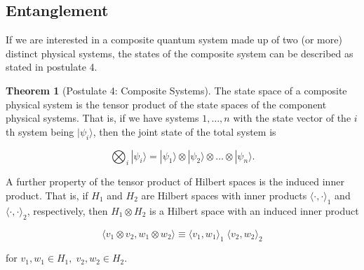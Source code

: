 \documentclass{article}
\theoremstyle{definition}
\newtheorem{theorem}{Theorem}[section]
\begin{document}
  \subsection{Entanglement}

    If we are interested in a composite quantum system made up of two (or more) distinct physical systems, the states of the composite system can be described as stated in postulate 4. 

    \begin{theorem}[Postulate 4: Composite Systems]
      The state space of a composite physical system is the tensor product of the state spaces of the component physical systems. That is, if we have systems $1, \ldots, n$ with the state vector of the $i$th system being $|\psi_i \rangle$, then the joint state of the total system is

        \[\bigotimes_i |\psi_i \rangle = |\psi_1 \rangle \otimes |\psi_2 \rangle \otimes \ldots \otimes |\psi_n \rangle.\]
    \end{theorem}

    A further property of the tensor product of Hilbert spaces is the induced inner product. That is, if $H_1$ and $H_2$ are Hilbert spaces with inner products $\langle \cdot, \cdot \rangle_1$ and $\langle \cdot, \cdot \rangle_2$, respectively, then $H_1 \otimes H_2$ is a Hilbert space with an induced inner product

      \[\langle v_1 \otimes v_2 , w_1 \otimes w_2 \rangle \equiv \langle v_1, w_1\rangle_1 \; \langle v_2, w_2 \rangle_2\]

    for $v_1, w_1 \in H_1, \; v_2, w_2 \in H_2$. 
\end{document}
